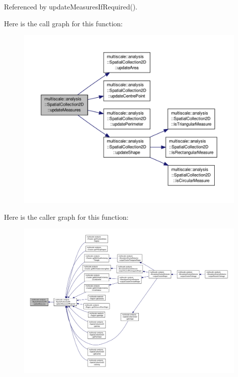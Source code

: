 Referenced by update\-Measures\-If\-Required().



Here is the call graph for this function\-:\nopagebreak
\begin{figure}[H]
\begin{center}
\leavevmode
\includegraphics[width=350pt]{classmultiscale_1_1analysis_1_1SpatialCollection2D_a8e5a2af581895142da9b50eeeabeb7be_cgraph}
\end{center}
\end{figure}




Here is the caller graph for this function\-:\nopagebreak
\begin{figure}[H]
\begin{center}
\leavevmode
\includegraphics[width=350pt]{classmultiscale_1_1analysis_1_1SpatialCollection2D_a8e5a2af581895142da9b50eeeabeb7be_icgraph}
\end{center}
\end{figure}


